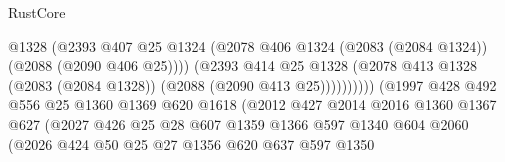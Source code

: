 \begin{lexlean}{RustCore}
\begin{coremodule}
                                            @1328
                                            (@2393
                                              @407
                                              @25
                                              @1324
                                              (@2078
                                                @406
                                                @1324
                                                (@2083 (@2084 @1324))
                                                (@2088 (@2090 @406 @25))))
                                            (@2393
                                              @414
                                              @25
                                              @1328
                                              (@2078
                                                @413
                                                @1328
                                                (@2083 (@2084 @1328))
                                                (@2088 (@2090 @413 @25))))))))))
                                (@1997
                                  @428
                                  @492
                                  @556
                                  @25
                                  @1360
                                  @1369
                                  @620
                                  @1618
                                  (@2012
                                    @427
                                    @2014
                                    @2016
                                    @1360
                                    @1367
                                    @627
                                    (@2027
                                      @426
                                      @25
                                      @28
                                      @607
                                      @1359
                                      @1366
                                      @597
                                      @1340
                                      @604
                                      @2060
                                      (@2026
                                        @424
                                        @50
                                        @25
                                        @27
                                        @1356
                                        @620
                                        @637
                                        @597
                                        @1350

\end{coremodule}
\end{lexlean}
